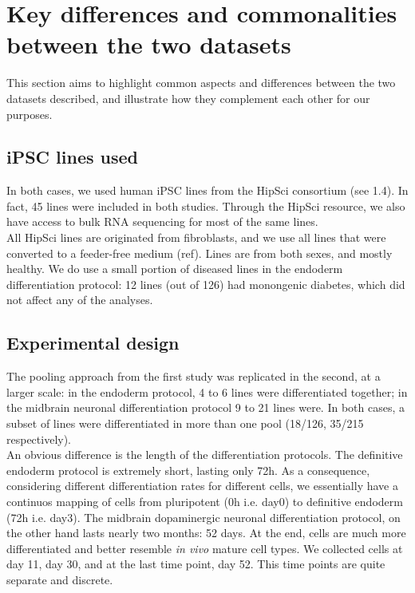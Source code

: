 \newpage

\section{Key differences and commonalities between the two datasets}

This section aims to highlight common aspects and differences between the two datasets described, and illustrate how they complement each other for our purposes.

\subsection{iPSC lines used}
In both cases, we used human iPSC lines from the HipSci consortium (see 1.4). 
In fact, 45 lines were included in both studies.
Through the HipSci resource, we also have access to bulk RNA sequencing for most of the same lines.\\


All HipSci lines are originated from fibroblasts, and we use all lines that were converted to a feeder-free medium (ref).
Lines are from both sexes, and mostly healthy. 
We do use a small portion of diseased lines in the endoderm differentiation protocol: 12 lines (out of 126) had monongenic diabetes, which did not affect any of the analyses. 

\subsection{Experimental design}
The pooling approach from the first study was replicated in the second, at a larger scale: in the endoderm protocol, 4 to 6 lines were differentiated together; in the midbrain neuronal differentiation protocol 9 to 21 lines were.
In both cases, a subset of lines were differentiated in more than one pool (18/126, 35/215 respectively).\\

An obvious difference is the length of the differentiation protocols.
The definitive endoderm protocol is extremely short, lasting only 72h.
As a consequence, considering different differentiation rates for different cells, we essentially have a continuos mapping of cells from pluripotent (0h i.e. day0) to definitive endoderm (72h i.e. day3).
The midbrain dopaminergic neuronal differentiation protocol, on the other hand lasts nearly two months: 52 days.
At the end, cells are much more differentiated and better resemble \textit{in vivo }mature cell types.
We collected cells at day 11, day 30, and at the last time point, day 52.
This time points are quite separate and discrete.


